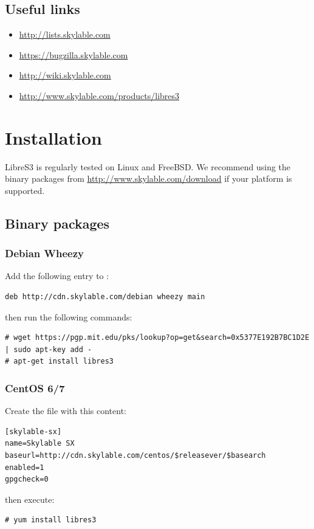 \section{Useful links}
\begin{itemize}
    \item \url{http://lists.skylable.com}
    \item \url{https://bugzilla.skylable.com}
    \item \url{http://wiki.skylable.com}
    \item \url{http://www.skylable.com/products/libres3}
\end{itemize}

\chapter{Installation}

LibreS3 is regularly tested on Linux and FreeBSD. We recommend using the
binary packages from \url{http://www.skylable.com/download} if your platform
is supported.

\section{Binary packages}

\subsection{Debian Wheezy}
Add the following entry to :
\begin{lstlisting}
deb http://cdn.skylable.com/debian wheezy main
\end{lstlisting}
then run the following commands:
\begin{lstlisting}
# wget https://pgp.mit.edu/pks/lookup?op=get&search=0x5377E192B7BC1D2E | sudo apt-key add -
# apt-get install libres3
\end{lstlisting}

\subsection{CentOS 6/7}
Create the file  with this content:
\begin{lstlisting}
[skylable-sx]
name=Skylable SX
baseurl=http://cdn.skylable.com/centos/$releasever/$basearch
enabled=1
gpgcheck=0
\end{lstlisting}
then execute:
\begin{lstlisting}
# yum install libres3
\end{lstlisting}

